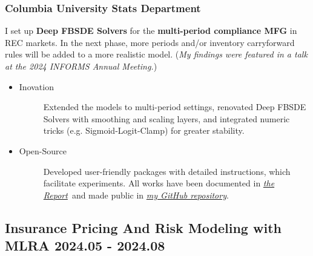 \documentclass[a4paper]{article}
\newcommand{\MFG}{\href{https://github.com/OrangeAoo/Multi-Period-Compliance-MFG-FBSDEs}{my GitHub repository}}
\newcommand{\Report}{\href{https://github.com/OrangeAoo/Multi-Compliance-MFG-FBSDEs/blob/ca6adb57636c1fc1ff9daea8d57f004e5762fd4d/FinalReports/Report-v3.pdf}{the Report}}
\begin{document}
\subsubsection{Columbia University Stats Department}
\vspace{3pt}
    I set up \textbf{Deep FBSDE Solvers} for the \textbf{multi-period compliance MFG} in REC markets. In the next phase, more periods and/or inventory carryforward rules will be added to a more realistic model. (\textit{My findings were featured in a talk at the 2024 INFORMS Annual Meeting.})
\begin{itemize}
    \item\begin{description}
        \item[Inovation] Extended the models to multi-period settings, renovated Deep FBSDE Solvers with smoothing and scaling layers, and integrated numeric tricks (e.g. Sigmoid-Logit-Clamp) for greater stability.
        \end{description}   
    \item \begin{description}
        \item[Open-Source] Developed user-friendly packages with detailed instructions, which facilitate experiments. All works have been documented in \textit{\Report}\ and made public in \textit{\MFG}.  
        \end{description}
\end{itemize}

\hypertarget{integrated-project}{
    \subsection{Insurance Pricing And Risk Modeling with ML\normalfont \hfill RA \hspace{40pt} 2024.05 - 2024.08}}
\end{document}
